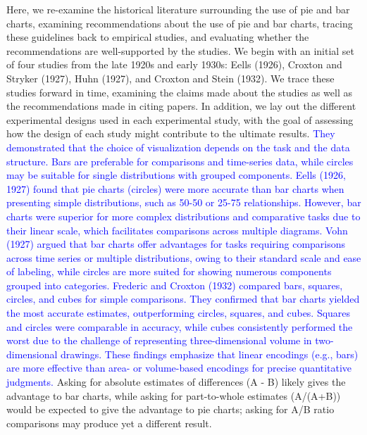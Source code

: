 \documentclass[
  10pt,
  letterpaper,
  twocolumn]{article}
\newcommand{\mt}[1]{{\textcolor{blue}{#1}}}
\newcommand{\svp}[1]{{\textcolor{RedOrange}{#1}}}
\begin{document}
\svp{Here, we re-examine the historical literature surrounding the use
of pie and bar charts, examining recommendations about the use of pie
and bar charts, tracing these guidelines back to empirical studies, and
evaluating whether the recommendations are well-supported by the
studies.} \svp{We begin with an initial set of four studies from the
late 1920s and early 1930s: Eells (1926), Croxton and Stryker (1927),
Huhn (1927), and Croxton and Stein (1932).} \svp{We trace these studies
forward in time, examining the claims made about the studies as well as
the recommendations made in citing papers.} \svp{In addition, we lay out
the different experimental designs used in each experimental study, with
the goal of assessing how the design of each study might contribute to
the ultimate results.} \mt{They demonstrated that the choice of
visualization depends on the task and the data structure. Bars are
preferable for comparisons and time-series data, while circles may be
suitable for single distributions with grouped components.} \mt{Eells
(1926, 1927) found that pie charts (circles) were more accurate than bar
charts when presenting simple distributions, such as 50-50 or 25-75
relationships. However, bar charts were superior for more complex
distributions and comparative tasks due to their linear scale, which
facilitates comparisons across multiple diagrams.} \mt{Vohn (1927)
argued that bar charts offer advantages for tasks requiring comparisons
across time series or multiple distributions, owing to their standard
scale and ease of labeling, while circles are more suited for showing
numerous components grouped into categories. Frederic and Croxton (1932)
compared bars, squares, circles, and cubes for simple comparisons. They
confirmed that bar charts yielded the most accurate estimates,
outperforming circles, squares, and cubes. Squares and circles were
comparable in accuracy, while cubes consistently performed the worst due
to the challenge of representing three-dimensional volume in
two-dimensional drawings. These findings emphasize that linear encodings
(e.g., bars) are more effective than area- or volume-based encodings for
precise quantitative judgments.} \svp{Asking for absolute estimates of
differences (A - B) likely gives the advantage to bar charts, while
asking for part-to-whole estimates (A/(A+B)) would be expected to give
the advantage to pie charts; asking for A/B ratio comparisons may
produce yet a different result.}
\end{document}
